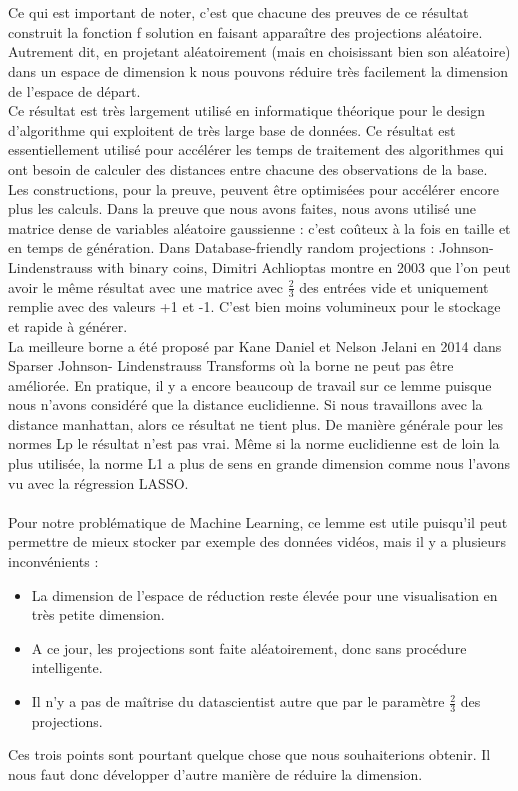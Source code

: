 \\
\\
Ce qui est important de noter, c’est que chacune des preuves de ce résultat construit la fonction f solution en faisant apparaître des projections aléatoire. Autrement dit, en projetant aléatoirement (mais en choisissant bien son aléatoire) dans un espace de dimension k nous pouvons réduire très facilement la dimension de l’espace de départ.
\\
Ce résultat est très largement utilisé en informatique théorique pour le design d’algorithme qui exploitent de très large base de données. Ce résultat est essentiellement utilisé pour accélérer les temps de traitement des algorithmes qui ont besoin de calculer des distances entre chacune des observations de la base.
\\
Les constructions, pour la preuve, peuvent être optimisées pour accélérer encore plus les calculs. Dans la preuve que nous avons faites, nous avons utilisé une matrice dense de variables aléatoire gaussienne : c’est coûteux à la fois en taille et en temps de génération. Dans Database-friendly random projections : Johnson-Lindenstrauss with binary coins, Dimitri Achlioptas montre en 2003 que l’on peut avoir le même résultat avec une matrice avec $\frac{2}{3}$ des entrées vide et uniquement remplie avec des valeurs +1 et -1. C’est bien moins volumineux pour le stockage et rapide à générer.
\\
La meilleure borne a été proposé par Kane Daniel et Nelson Jelani en 2014 dans Sparser Johnson- Lindenstrauss Transforms où la borne ne peut pas être améliorée. En pratique, il y a encore beaucoup de travail sur ce lemme puisque nous n’avons considéré que la distance euclidienne. Si nous travaillons avec la distance manhattan, alors ce résultat ne tient plus. De manière générale pour les normes Lp le résultat n’est pas vrai. Même si la norme euclidienne est de loin la plus utilisée, la norme L1 a plus de sens en grande dimension comme nous l’avons vu avec la régression LASSO.
\\
\\
Pour notre problématique de Machine Learning, ce lemme est utile puisqu’il peut permettre de mieux stocker par exemple des données vidéos, mais il y a plusieurs inconvénients :
\begin{itemize}
    \item La dimension de l’espace de réduction reste élevée pour une visualisation en très petite dimension.
    \item A ce jour, les projections sont faite aléatoirement, donc sans procédure intelligente.
    \item Il n’y a pas de maîtrise du datascientist autre que par le paramètre $\frac{2}{3}$ des projections.
\end{itemize} 
Ces trois points sont pourtant quelque chose que nous souhaiterions obtenir. Il nous faut donc développer d’autre manière de réduire la dimension.


